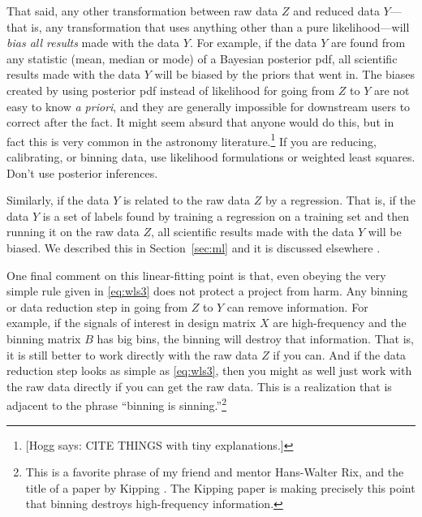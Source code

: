 \documentclass{article}
\newcommand{\sectionname}{Section}
\newcommand{\secref}[1]{\sectionname~\ref{#1}}
\newcommand{\foreign}[1]{\textsl{#1}}
\newcommand{\hogg}[1]{{\color{blue}[Hogg says: {#1}]}}
\begin{document}
That said, any other transformation between raw data $Z$ and reduced data $Y$---that is, any transformation that uses anything other than a pure likelihood---will \emph{bias all results} made with the data $Y$.
For example, if the data $Y$ are found from any statistic (mean, median or mode) of a Bayesian posterior pdf, all scientific results made with the data $Y$ will be biased by the priors that went in.
The biases created by using posterior pdf instead of likelihood for going from $Z$ to $Y$ are not easy to know \foreign{a priori}, and they are generally impossible for downstream users to correct after the fact.
It might seem absurd that anyone would do this, but in fact this is very common in the astronomy literature.\footnote{\hogg{CITE THINGS with tiny explanations.}}
If you are reducing, calibrating, or binning data, use likelihood formulations or weighted least squares.
Don't use posterior inferences.

Similarly, if the data $Y$ is related to the raw data $Z$ by a regression.
That is, if the data $Y$ is a set of labels found by training a regression on a training set and then running it on the raw data $Z$, all scientific results made with the data $Y$ will be biased.
We described this in \secref{sec:ml} and it is discussed elsewhere \cite{goodorbad, ting}.

One final comment on this linear-fitting point is that, even obeying the very simple rule given in \eqref{eq:wls3} does not protect a project from harm.
Any binning or data reduction step in going from $Z$ to $Y$ can remove information.
For example, if the signals of interest in design matrix $X$ are high-frequency and the binning matrix $B$ has big bins, the binning will destroy that information.
That is, it is still better to work directly with the raw data $Z$ if you can.
And if the data reduction step looks as simple as \eqref{eq:wls3}, then you might as well just work with the raw data directly if you can get the raw data.
This is a realization that is adjacent to the phrase ``binning is sinning.''\footnote{This is a favorite phrase of my friend and mentor Hans-Walter Rix, and the title of a paper by Kipping \cite{binningissinning}. The Kipping paper is making precisely this point that binning destroys high-frequency information.}
\end{document}
